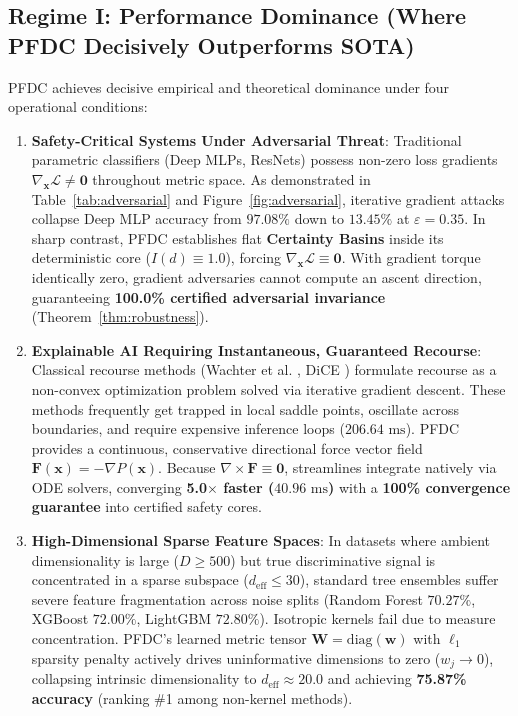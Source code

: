 \documentclass[preprint,review,12pt]{elsarticle}
\begin{document}
\subsection{Regime I: Performance Dominance (Where PFDC Decisively Outperforms SOTA)}
PFDC achieves decisive empirical and theoretical dominance under four operational conditions:
\begin{enumerate}
    \item \textbf{Safety-Critical Systems Under Adversarial Threat}: Traditional parametric classifiers (Deep MLPs, ResNets) possess non-zero loss gradients $\nabla_{\mathbf{x}} \mathcal{L} \ne \mathbf{0}$ throughout metric space. As demonstrated in Table~\ref{tab:adversarial} and Figure~\ref{fig:adversarial}, iterative gradient attacks collapse Deep MLP accuracy from $97.08\%$ down to $13.45\%$ at $\varepsilon = 0.35$. In sharp contrast, PFDC establishes flat \textbf{Certainty Basins} inside its deterministic core ($I(d) \equiv 1.0$), forcing $\nabla_{\mathbf{x}} \mathcal{L} \equiv \mathbf{0}$. With gradient torque identically zero, gradient adversaries cannot compute an ascent direction, guaranteeing \textbf{100.0\% certified adversarial invariance} (Theorem~\ref{thm:robustness}).
    \item \textbf{Explainable AI Requiring Instantaneous, Guaranteed Recourse}: Classical recourse methods (Wachter et al. \cite{wachter2017counterfactual}, DiCE \cite{mothilal2020explaining}) formulate recourse as a non-convex optimization problem solved via iterative gradient descent. These methods frequently get trapped in local saddle points, oscillate across boundaries, and require expensive inference loops ($206.64\text{ ms}$). PFDC provides a continuous, conservative directional force vector field $\mathbf{F}(\mathbf{x}) = -\nabla P(\mathbf{x})$. Because $\nabla \times \mathbf{F} \equiv \mathbf{0}$, streamlines integrate natively via ODE solvers, converging \textbf{5.0$\times$ faster ($40.96\text{ ms}$)} with a \textbf{100\% convergence guarantee} into certified safety cores.
    \item \textbf{High-Dimensional Sparse Feature Spaces}: In datasets where ambient dimensionality is large ($D \ge 500$) but true discriminative signal is concentrated in a sparse subspace ($d_{\mathrm{eff}} \le 30$), standard tree ensembles suffer severe feature fragmentation across noise splits (Random Forest $70.27\%$, XGBoost $72.00\%$, LightGBM $72.80\%$). Isotropic kernels fail due to measure concentration. PFDC's learned metric tensor $\mathbf{W} = \mathrm{diag}(\mathbf{w})$ with $\ell_1$ sparsity penalty actively drives uninformative dimensions to zero ($w_j \to 0$), collapsing intrinsic dimensionality to $d_{\mathrm{eff}} \approx 20.0$ and achieving \textbf{75.87\% accuracy} (ranking \#1 among non-kernel methods).

\end{enumerate}
\end{document}
